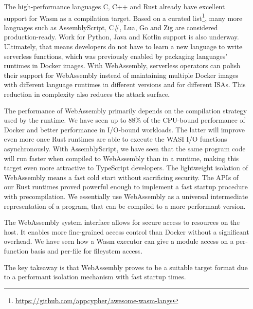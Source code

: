 \begin{description}[style=multiline, leftmargin=2.5cm, font=\bfseries]

    \item[Language Support] The high-performance languages C, C++ and Rust already have excellent support for Wasm as a compilation target. Based on a curated list\footnote{\url{https://github.com/appcypher/awesome-wasm-langs}}, many more languages such as AssemblyScript, C\#, Lua, Go and Zig are considered production-ready. Work for Python, Java and Kotlin support is also underway.
    Ultimately, that means developers do not have to learn a new language to write serverless functions, which was previously enabled by packaging languages' runtimes in Docker images. With WebAssembly, serverless operators can polish their support for WebAssembly instead of maintaining multiple Docker images with different language runtimes in different versions and for different ISAs. This reduction in complexity also reduces the attack surface.

    \item[Performance \& Cold Start] The performance of WebAssembly primarily depends on the compilation strategy used by the runtime. We have seen up to 88\% of the CPU-bound performance of Docker and better performance in I/O-bound workloads. The latter will improve even more once Rust runtimes are able to execute the WASI I/O functions asynchronously. With AssemblyScript, we have seen that the same program code will run faster when compiled to WebAssembly than in a  runtime, making this target even more attractive to TypeScript developers. The lightweight isolation of WebAssembly means a fast cold start without sacrificing security. The APIs of our Rust runtimes proved powerful enough to implement a fast startup procedure with precompilation. We essentially use WebAssembly as a universal intermediate representation of a program, that can be compiled to a more performant version.

    \item[System Access] The WebAssembly system interface allows for secure access to resources on the host. It enables more fine-grained access control than Docker without a significant overhead. We have seen how a Wasm executor can give a module access on a per-function basis and per-file for fileystem access.

\end{description}

The key takeaway is that WebAssembly proves to be a suitable target format due to a performant isolation mechanism with fast startup times.

